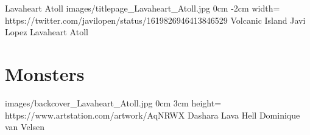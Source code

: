 \documentclass[letterpaper,openany,twoside,twocolumn]{book}
\begin{document}
	\regionTitlePage
		{Lavaheart Atoll}
		{images/titlepage_Lavaheart_Atoll.jpg}
		{0cm}
		{-2cm}
		{width=\paperwidth}
		{https://twitter.com/javilopen/status/1619826946413846529}
		{Volcanic Island}
		{Javi Lopez}
		{Lavaheart Atoll}
	
	\tableofcontents
	
	\mainmatter
	
	\MonsterSheetGeometry
	\part{Monsters}
	
	
	\bookLastPage
		{images/backcover_Lavaheart_Atoll.jpg}
		{0cm}
		{3cm}
		{height=\paperheight}
		{https://www.artstation.com/artwork/AqNRWX}
		{Dashara Lava Hell}
		{Dominique van Velsen}
		{}
\end{document}
